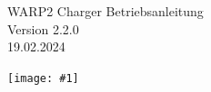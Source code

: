 \documentclass[a4paper,10pt]{article}
\title{}
\author{}
\newcommand{\gfx}[1]{\texttt{[image: \#1]}}
\begin{document}
\pagestyle{empty}
\begin{titlepage}
	\vspace*{-3.08cm}
	\colorbox{boxgray}{}
	\vfill
	\begin{center}
		\Huge
		WARP2 Charger Betriebsanleitung\\\vspace{1cm}
		\large
		Version 2.2.0\\\vspace{0.25cm}
		19.02.2024
	\end{center}
	\vfill \gfx{./img_warp2/resized/warp_perspective_blue_ready}
\end{titlepage}
\newpage
\null
\newpage
\pagestyle{fancy}
\end{document}
